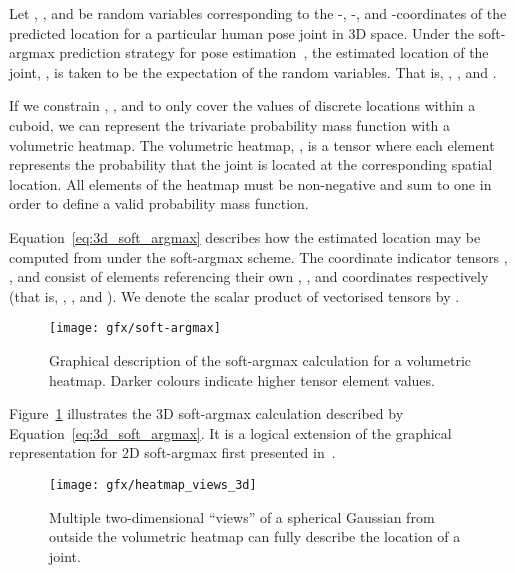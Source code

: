 \documentclass[australian,10pt,twocolumn,letterpaper,twocolumn]{article}
\makeatletter
\renewcommand{\paragraph}{\@startsection{paragraph}{4}{\z@}{0.7ex \@plus 0.2ex \@minus 0.2ex}{-1em}{\normalfont\normalsize\bfseries}}
\makeatother
\begin{document}
\paragraph{Volumetric heatmaps.}

Let , , and  be random variables corresponding to the
-, -, and -coordinates of the predicted location for a
particular human pose joint in 3D space. Under the soft-argmax prediction
strategy for pose estimation~\citep{luvizon2017human}, the estimated
location of the joint, , is taken to be the expectation
of the random variables. That is, ,
, and . 

If we constrain , , and  to only cover the values of discrete
locations within a cuboid, we can represent the trivariate probability
mass function  with a volumetric heatmap. The volumetric
heatmap, , is a 
tensor where each element represents the probability that the joint
is located at the corresponding spatial location. All elements of
the heatmap must be non-negative and sum to one in order to define
a valid probability mass function.

Equation~\ref{eq:3d_soft_argmax} describes how the estimated location
may be computed from  under the soft-argmax
scheme. The coordinate indicator tensors ,
, and  consist
of elements referencing their own , , and  coordinates
respectively (that is, , ,
and ). We denote the scalar product of vectorised
tensors by .


\begin{figure}
\begin{centering}
\texttt{[image: gfx/soft-argmax]}
\par\end{centering}
\caption{\label{fig:3d_soft_argmax}Graphical description of the soft-argmax
calculation for a volumetric heatmap. Darker colours indicate higher
tensor element values.}
\end{figure}
Figure~\ref{fig:3d_soft_argmax} illustrates the 3D soft-argmax calculation
described by Equation~\ref{eq:3d_soft_argmax}. It is a logical extension
of the graphical representation for 2D soft-argmax first presented
in~\citep{luvizon20182d}.

\begin{figure}
\begin{centering}
\texttt{[image: gfx/heatmap\_views\_3d]}
\par\end{centering}
\caption{\label{fig:hm_views}Multiple two-dimensional ``views'' of a spherical
Gaussian from outside the volumetric heatmap can fully describe the
location of a joint.}
\end{figure}
\end{document}
